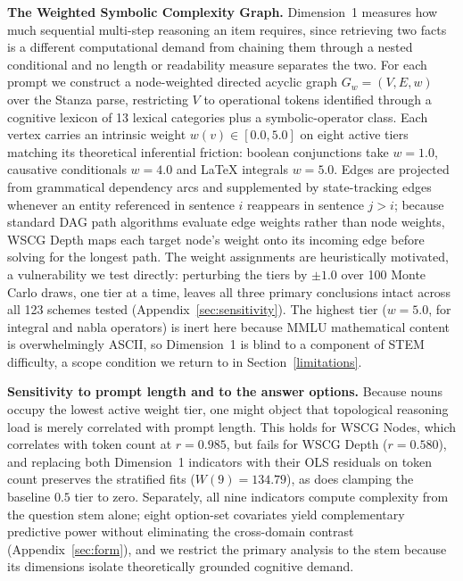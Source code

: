 \textbf{The Weighted Symbolic Complexity Graph.}\label{sec:d1} Dimension~1 measures how much sequential multi-step reasoning an item requires, since retrieving two facts is a different computational demand from chaining them through a nested conditional and no length or readability measure separates the two. For each prompt we construct a node-weighted directed acyclic graph $G_{w} = (V,E,w)$ over the Stanza parse, restricting $V$ to operational tokens identified through a cognitive lexicon of 13 lexical categories plus a symbolic-operator class. Each vertex carries an intrinsic weight $w(v) \in [ 0.0,5.0]$ on eight active tiers matching its theoretical inferential friction: boolean conjunctions take $w = 1.0$, causative conditionals $w = 4.0$ and \LaTeX{} integrals $w = 5.0$. Edges are projected from grammatical dependency arcs and supplemented by state-tracking edges whenever an entity referenced in sentence $i$ reappears in sentence $j > i$; because standard DAG path algorithms evaluate edge weights rather than node weights, WSCG Depth maps each target node's weight onto its incoming edge before solving for the longest path. The weight assignments are heuristically motivated, a vulnerability we test directly: perturbing the tiers by $\pm 1.0$ over 100 Monte Carlo draws, one tier at a time, leaves all three primary conclusions intact across all 123 schemes tested (Appendix~\ref{sec:sensitivity}). The highest tier ($w = 5.0$, for integral and nabla operators) is inert here because MMLU mathematical content is overwhelmingly ASCII, so Dimension~1 is blind to a component of STEM difficulty, a scope condition we return to in Section~\ref{limitations}.

\textbf{Sensitivity to prompt length and to the answer options.} Because nouns occupy the lowest active weight tier, one might object that topological reasoning load is merely correlated with prompt length. This holds for WSCG Nodes, which correlates with token count at $r = 0.985$, but fails for WSCG Depth ($r = 0.580$), and replacing both Dimension~1 indicators with their OLS residuals on token count preserves the stratified fits ($W(9) = 134.79$), as does clamping the baseline $0.5$ tier to zero. Separately, all nine indicators compute complexity from the question stem alone; eight option-set covariates yield complementary predictive power without eliminating the cross-domain contrast (Appendix~\ref{sec:form}), and we restrict the primary analysis to the stem because its dimensions isolate theoretically grounded cognitive demand.

